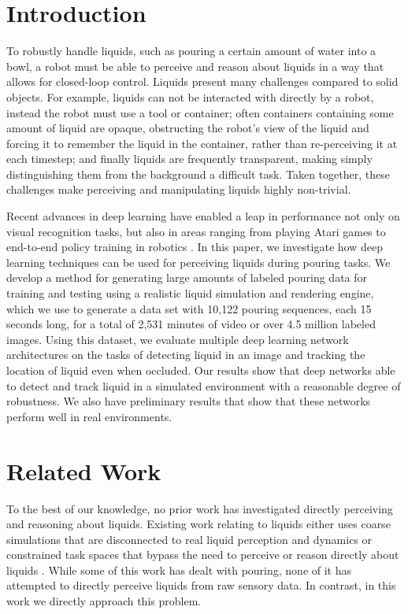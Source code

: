 \documentclass[runningheads,a4paper]{llncs}
\begin{document}
\section{Introduction}

To robustly handle liquids, such as pouring a certain amount of water into a
bowl, a robot must be able to perceive and reason about liquids in a way that
allows for closed-loop control. Liquids present many challenges compared to
solid objects. For example, liquids can not be interacted with directly by a
robot, instead the robot must use a tool or container; often containers
containing some amount of liquid are opaque, obstructing the robot's view of the
liquid and forcing it to remember the liquid in the container, rather than
re-perceiving it at each timestep; and finally liquids are frequently
transparent, making simply distinguishing them from the background a difficult
task. Taken together, these challenges make perceiving and manipulating liquids
highly non-trivial.

Recent advances in deep learning have enabled a leap in performance not only on visual recognition tasks, but also in areas ranging from playing Atari games \cite{guo2014} to end-to-end policy training in robotics \cite{levine2015}.  
In this paper, we investigate how deep learning techniques can be used for perceiving liquids during pouring tasks.  
We develop a method for generating large amounts of labeled pouring data for training and testing using a realistic liquid simulation and rendering engine, which we use to generate a data set with 10,122 pouring sequences, each 15 seconds long, for a total of 2,531 minutes of video or over 4.5 million labeled images. 
Using this dataset, we evaluate multiple deep learning network architectures on the tasks of detecting liquid in an image and tracking the location of liquid even when occluded. 
Our results show that deep networks able to detect and track liquid in a simulated environment with a reasonable degree of robustness. 
We also have preliminary results that show that these networks perform well in real environments.

\vspace{-0.5cm}
\section{Related Work}
\vspace{-0.3cm}

To the best of our knowledge, no prior work has investigated directly perceiving
and reasoning about liquids. Existing work relating to liquids either uses
coarse simulations that are disconnected to real liquid perception and dynamics
\cite{kunze2015,yamaguchi2015} or constrained task spaces that bypass
the need to perceive or reason directly about liquids
\cite{langsfeld2014,okada2006,tamosiunaite2011,cakmak2012,rozo2013}. 
While some of this work has dealt with pouring, none of it has attempted to directly perceive liquids from raw sensory data. 
In contrast, in this work we directly approach this problem.
\end{document}
